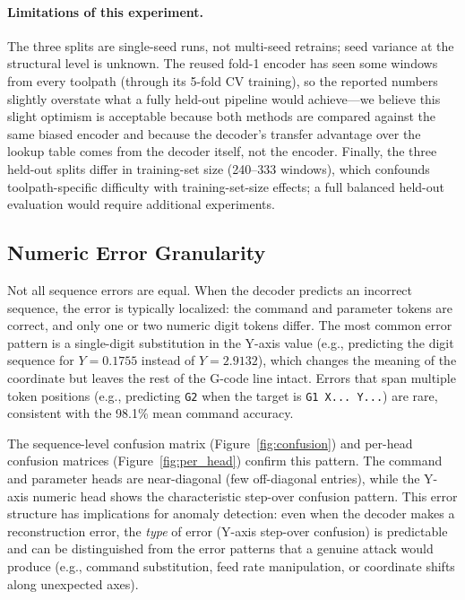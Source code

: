\documentclass[sensors,article,submit,moreauthors,pdftex]{Definitions/mdpi}
\begin{document}
\paragraph{Limitations of this experiment.} The three splits are single-seed runs, not multi-seed retrains; seed variance at the structural level is unknown. The reused fold-1 encoder has seen some windows from every toolpath (through its 5-fold CV training), so the reported numbers slightly overstate what a fully held-out pipeline would achieve---we believe this slight optimism is acceptable because both methods are compared against the same biased encoder and because the decoder's transfer advantage over the lookup table comes from the decoder itself, not the encoder. Finally, the three held-out splits differ in training-set size (240--333 windows), which confounds toolpath-specific difficulty with training-set-size effects; a full balanced held-out evaluation would require additional experiments.

\subsection{Numeric Error Granularity}
\label{sec:y_ambiguity}

Not all sequence errors are equal. When the decoder predicts an incorrect sequence, the error is typically localized: the command and parameter tokens are correct, and only one or two numeric digit tokens differ. The most common error pattern is a single-digit substitution in the Y-axis value (e.g., predicting the digit sequence for $Y = 0.1755$ instead of $Y = 2.9132$), which changes the meaning of the coordinate but leaves the rest of the G-code line intact. Errors that span multiple token positions (e.g., predicting \texttt{G2} when the target is \texttt{G1 X... Y...}) are rare, consistent with the 98.1\% mean command accuracy.

The sequence-level confusion matrix (Figure~\ref{fig:confusion}) and per-head confusion matrices (Figure~\ref{fig:per_head}) confirm this pattern. The command and parameter heads are near-diagonal (few off-diagonal entries), while the Y-axis numeric head shows the characteristic step-over confusion pattern. This error structure has implications for anomaly detection: even when the decoder makes a reconstruction error, the \emph{type} of error (Y-axis step-over confusion) is predictable and can be distinguished from the error patterns that a genuine attack would produce (e.g., command substitution, feed rate manipulation, or coordinate shifts along unexpected axes).
\end{document}
